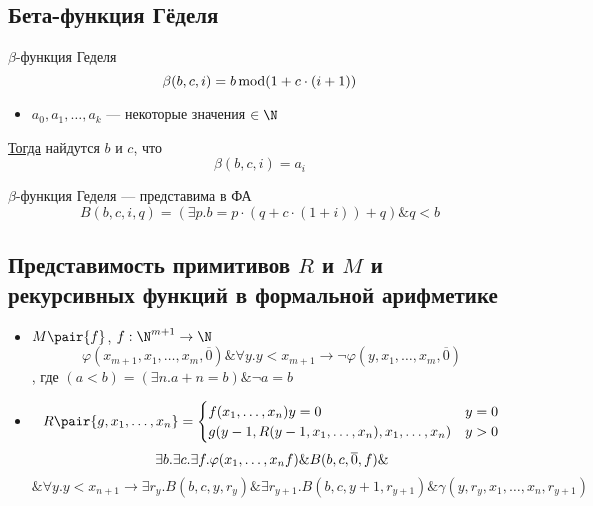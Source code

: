 \documentclass[english]{article}
\begin{document}
\subsection{Бета-функция Гёделя}
\label{sec:orgde0e6fa}
\begin{definition}
	\(\beta\)-функция Геделя
	\[ \beta(b, c, i) = b \mathop{\rm mod} (1 + c\cdot(i + 1)) \]
	\label{org7b1a953}
\end{definition}
\begin{theorem}
	\-
	\begin{itemize}
		\item \(a_0, a_1, \dots, a_k\) --- некоторые значения \(\in \N\)
	\end{itemize}
	\uline{Тогда} найдутся \(b\) и \(c\), что
	\[ \beta(b, c, i) = a_i \]
	\label{orga40181e}
\end{theorem}
\begin{remark}
	\(\beta\)-функция Геделя --- представима в ФА
	\[ B(b, c, i, q) = (\exists p. b = p\cdot(q + c\cdot(1 + i)) + q) \& q < b \]
	\label{org562d016}
\end{remark}
\subsection{Представимость примитивов \(R\) и \(M\) и рекурсивных функций в формальной арифметике}
\label{sec:orgb36ab05}
\begin{remark}
	\-
	\begin{itemize}
		\item \(M\pair{f}\),  \(f: \N^{m + 1} \to \N\)
		      \[ \varphi(x_{m + 1}, x_1, \dots, x_m, \overline{0}) \& \forall y. y < x_{m + 1} \to \neg \varphi(y, x_1, \dots, x_m, \overline{0}) \]
		      , где \((a < b) = (\exists n. a+ n = b)\&\neg a = b\)
		\item \[R\pair{g, x_1, \dots, x_n}  = \begin{cases}
				      f(x_1, \dots, x_n) y = 0                             & y = 0 \\
				      g(y - 1, R(y - 1, x_1, \dots, x_n), x_1, \dots, x_n) & y > 0
			      \end{cases}\]
		      \[ \exists b. \exists c. \exists f. \varphi(x_1, \dots, x_n f) \& B(b, c, \overline{0}, f) \& \\ \]
		      \[ \& \forall y. y < x_{n + 1} \to \exists r_{y}. B(b, c, y, r_{y})\&\exists r_{y + 1}. B(b, c, y + 1, r_{y + 1})\&\gamma(y, r_{y}, x_1, \dots, x_n, r_{y + 1}) \]
	\end{itemize}
	\label{org52dc2d1}
\end{remark}
\end{document}
